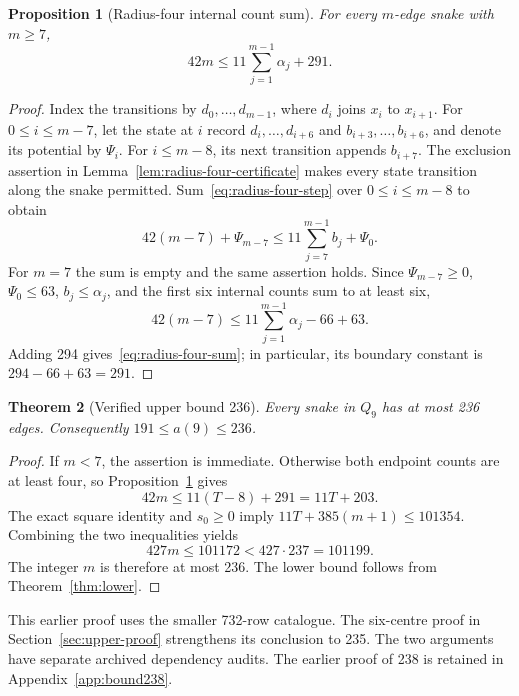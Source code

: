 \documentclass[11pt,a4paper]{article}
\newtheorem{theorem}{Theorem}[section]
\newtheorem{proposition}[theorem]{Proposition}
\theoremstyle{definition}
\theoremstyle{remark}
\newcommand{\Q}{Q}
\begin{document}
\begin{proposition}[Radius-four internal count sum]\label{prop:radius-four-sum}
For every $m$-edge snake with $m\ge7$,
\begin{equation}\label{eq:radius-four-sum}
42m\le11\sum_{j=1}^{m-1}\alpha_j+291.
\end{equation}
\end{proposition}
\begin{proof}
Index the transitions by $d_0,\ldots,d_{m-1}$, where $d_i$ joins $x_i$ to $x_{i+1}$. For $0\le i\le m-7$, let the state at $i$ record $d_i,\ldots,d_{i+6}$ and $b_{i+3},\ldots,b_{i+6}$, and denote its potential by $\Psi_i$. For $i\le m-8$, its next transition appends $b_{i+7}$. The exclusion assertion in Lemma~\ref{lem:radius-four-certificate} makes every state transition along the snake permitted. Sum~\eqref{eq:radius-four-step} over $0\le i\le m-8$ to obtain
\[
42(m-7)+\Psi_{m-7}\le11\sum_{j=7}^{m-1}b_j+\Psi_0.
\]
For $m=7$ the sum is empty and the same assertion holds. Since $\Psi_{m-7}\ge0$, $\Psi_0\le63$, $b_j\le\alpha_j$, and the first six internal counts sum to at least six,
\[
42(m-7)\le11\sum_{j=1}^{m-1}\alpha_j-66+63.
\]
Adding 294 gives~\eqref{eq:radius-four-sum}; in particular, its boundary constant is $294-66+63=291$.
\end{proof}

\begin{theorem}[Verified upper bound 236]\label{thm:upper236}
Every snake in $\Q_9$ has at most 236 edges. Consequently $191\le a(9)\le236$.
\end{theorem}
\begin{proof}
If $m<7$, the assertion is immediate. Otherwise both endpoint counts are at least four, so Proposition~\ref{prop:radius-four-sum} gives
\[
42m\le11(T-8)+291=11T+203.
\]
The exact square identity and $s_0\ge0$ imply $11T+385(m+1)\le101354$. Combining the two inequalities yields
\[
427m\le101172<427\cdot237=101199.
\]
The integer $m$ is therefore at most 236. The lower bound follows from Theorem~\ref{thm:lower}.
\end{proof}

This earlier proof uses the smaller 732-row catalogue. The six-centre proof in Section~\ref{sec:upper-proof} strengthens its conclusion to 235. The two arguments have separate archived dependency audits. The earlier proof of 238 is retained in Appendix~\ref{app:bound238}.
\end{document}
